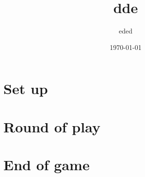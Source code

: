 \documentclass{article}%
\title{dde}%
\author{eded}%
\date{\today}%
\begin{document}
%
\pagestyle{empty}%
\normalsize%
\maketitle%
\section{ Set up
}%
\label{sec:Setup}%

%
\section{ Round of play
}%
\label{sec:Roundofplay}%

%
\section{ End of game}%
\label{sec:Endofgame}%

%
\end{document}
